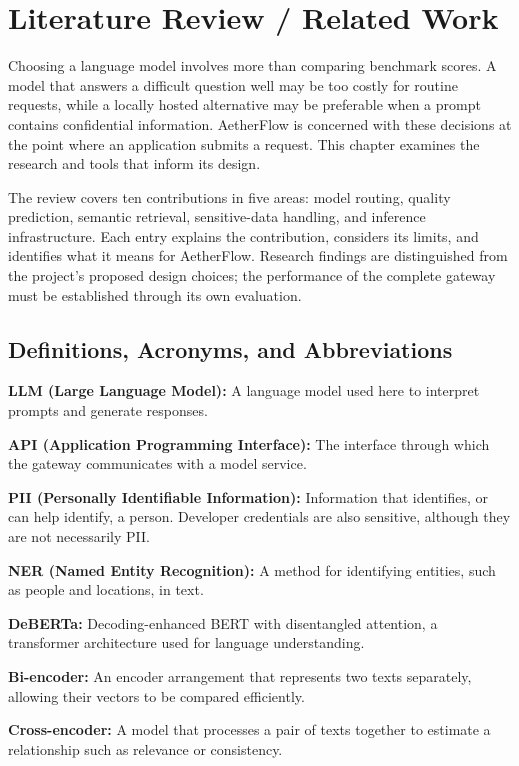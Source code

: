 \chapter{Literature Review / Related Work}

Choosing a language model involves more than comparing benchmark scores. A model that answers a difficult question well may be too costly for routine requests, while a locally hosted alternative may be preferable when a prompt contains confidential information. AetherFlow is concerned with these decisions at the point where an application submits a request. This chapter examines the research and tools that inform its design.

The review covers ten contributions in five areas: model routing, quality prediction, semantic retrieval, sensitive-data handling, and inference infrastructure. Each entry explains the contribution, considers its limits, and identifies what it means for AetherFlow. Research findings are distinguished from the project's proposed design choices; the performance of the complete gateway must be established through its own evaluation.

\section{Definitions, Acronyms, and Abbreviations}

\noindent\textbf{LLM (Large Language Model):} A language model used here to interpret prompts and generate responses.

\noindent\textbf{API (Application Programming Interface):} The interface through which the gateway communicates with a model service.

\noindent\textbf{PII (Personally Identifiable Information):} Information that identifies, or can help identify, a person. Developer credentials are also sensitive, although they are not necessarily PII.

\noindent\textbf{NER (Named Entity Recognition):} A method for identifying entities, such as people and locations, in text.

\noindent\textbf{DeBERTa:} Decoding-enhanced BERT with disentangled attention, a transformer architecture used for language understanding.

\noindent\textbf{Bi-encoder:} An encoder arrangement that represents two texts separately, allowing their vectors to be compared efficiently.

\noindent\textbf{Cross-encoder:} A model that processes a pair of texts together to estimate a relationship such as relevance or consistency.

